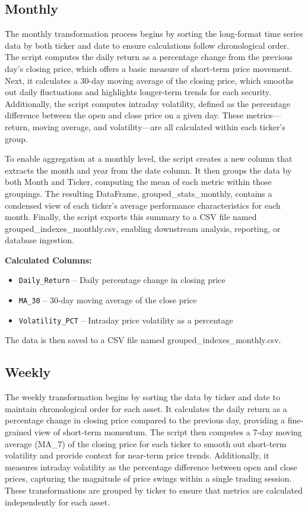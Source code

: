 \documentclass[12pt]{article}
\begin{document}
\subsection{Monthly}
The monthly transformation process begins by sorting the long-format time series data by both ticker and date to ensure calculations follow chronological order. The script computes the daily return as a percentage change from the previous day's closing price, which offers a basic measure of short-term price movement. Next, it calculates a 30-day moving average of the closing price, which smooths out daily fluctuations and highlights longer-term trends for each security. Additionally, the script computes intraday volatility, defined as the percentage difference between the open and close price on a given day. These metrics—return, moving average, and volatility—are all calculated within each ticker's group.

To enable aggregation at a monthly level, the script creates a new column that extracts the month and year from the date column. It then groups the data by both Month and Ticker, computing the mean of each metric within those groupings. The resulting DataFrame, grouped\_stats\_monthly, contains a condensed view of each ticker's average performance characteristics for each month. Finally, the script exports this summary to a CSV file named grouped\_indexes\_monthly.csv, enabling downstream analysis, reporting, or database ingestion.

\vspace{1em}
\noindent
\textbf{Calculated Columns:}
\begin{itemize}
    \item \texttt{Daily\_Return} – Daily percentage change in closing price
    \item \texttt{MA\_30} – 30-day moving average of the close price
    \item \texttt{Volatility\_PCT} – Intraday price volatility as a percentage
\end{itemize}

The data is then saved to a CSV file named grouped\_indexes\_monthly.csv.

\subsection{Weekly}
The weekly transformation begins by sorting the data by ticker and date to maintain chronological order for each asset. It calculates the daily return as a percentage change in closing price compared to the previous day, providing a fine-grained view of short-term momentum. The script then computes a 7-day moving average (MA\_7) of the closing price for each ticker to smooth out short-term volatility and provide context for near-term price trends. Additionally, it measures intraday volatility as the percentage difference between open and close prices, capturing the magnitude of price swings within a single trading session. These transformations are grouped by ticker to ensure that metrics are calculated independently for each asset.
\end{document}
